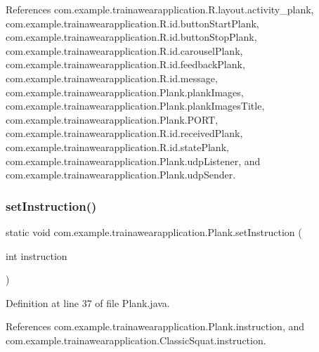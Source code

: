 References com.\+example.\+trainawearapplication.\+R.\+layout.\+activity\+\_\+plank, com.\+example.\+trainawearapplication.\+R.\+id.\+button\+Start\+Plank, com.\+example.\+trainawearapplication.\+R.\+id.\+button\+Stop\+Plank, com.\+example.\+trainawearapplication.\+R.\+id.\+carousel\+Plank, com.\+example.\+trainawearapplication.\+R.\+id.\+feedback\+Plank, com.\+example.\+trainawearapplication.\+R.\+id.\+message, com.\+example.\+trainawearapplication.\+Plank.\+plank\+Images, com.\+example.\+trainawearapplication.\+Plank.\+plank\+Images\+Title, com.\+example.\+trainawearapplication.\+Plank.\+P\+O\+RT, com.\+example.\+trainawearapplication.\+R.\+id.\+received\+Plank, com.\+example.\+trainawearapplication.\+R.\+id.\+state\+Plank, com.\+example.\+trainawearapplication.\+Plank.\+udp\+Listener, and com.\+example.\+trainawearapplication.\+Plank.\+udp\+Sender.

\mbox{\label{classcom_1_1example_1_1trainawearapplication_1_1_plank_a3cc3d10c2310227ff9fe69e49afac328}} 
\subsubsection{\texorpdfstring{setInstruction()}{setInstruction()}}
{\footnotesize\ttfamily static void com.\+example.\+trainawearapplication.\+Plank.\+set\+Instruction (\begin{DoxyParamCaption}\item[{int}]{instruction }\end{DoxyParamCaption})\hspace{0.3cm}{\ttfamily [static]}}



Definition at line 37 of file Plank.\+java.


\begin{DoxyCode}{0}

\end{DoxyCode}


References com.\+example.\+trainawearapplication.\+Plank.\+instruction, and com.\+example.\+trainawearapplication.\+Classic\+Squat.\+instruction.

